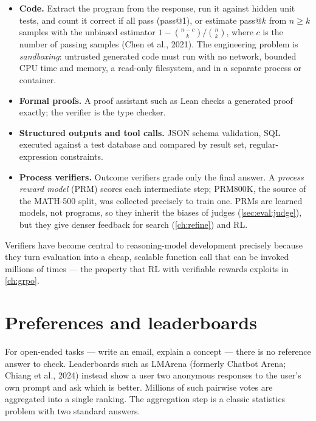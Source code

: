 \begin{itemize}
  \item \textbf{Code.} Extract the program from the response, run it against hidden unit tests,
  and count it correct if all pass (pass@1), or estimate pass@$k$ from $n \ge k$ samples with the
  unbiased estimator $1 - \binom{n-c}{k}/\binom{n}{k}$, where $c$ is the number of passing samples
  (Chen et al., 2021). The engineering problem is \emph{sandboxing}: untrusted generated code must
  run with no network, bounded CPU time and memory, a read-only filesystem, and in a separate
  process or container.
  \item \textbf{Formal proofs.} A proof assistant such as Lean checks a generated proof
  exactly; the verifier is the type checker.
  \item \textbf{Structured outputs and tool calls.} JSON schema validation, SQL executed against a
  test database and compared by result set, regular-expression constraints.
  \item \textbf{Process verifiers.} Outcome verifiers grade only the final answer. A
  \emph{process reward model} (PRM) scores each intermediate step; PRM800K, the source of the
  MATH-500 split, was collected precisely to train one. PRMs are learned models, not programs, so
  they inherit the biases of judges (\cref{sec:eval:judge}), but they give denser feedback for
  search (\cref{ch:refine}) and RL.
\end{itemize}

Verifiers have become central to reasoning-model development precisely because they turn
evaluation into a cheap, scalable function call that can be invoked millions of times --- the
property that RL with verifiable rewards exploits in \cref{ch:grpo}.

\section{Preferences and leaderboards}\label{sec:eval:leaderboards}

For open-ended tasks --- write an email, explain a concept --- there is no reference answer to
check. Leaderboards such as LMArena (formerly Chatbot Arena; Chiang et al., 2024) instead show a
user two anonymous responses to the user's own prompt and ask which is better. Millions of such
pairwise votes are aggregated into a single ranking. The aggregation step is a classic statistics
problem with two standard answers.

